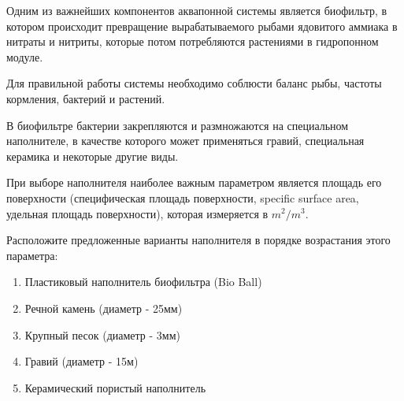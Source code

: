 
Одним из важнейших компонентов аквапонной системы является биофильтр, в котором происходит превращение вырабатываемого рыбами ядовитого аммиака в нитраты и нитриты, которые потом потребляются растениями в гидропонном модуле.

Для правильной работы системы необходимо соблюсти баланс рыбы, частоты кормления,  бактерий и растений.

В биофильтре бактерии закрепляются и размножаются на специальном наполнителе, в качестве которого может применяться гравий, специальная керамика и некоторые другие виды.

При выборе наполнителя наиболее важным параметром является площадь его поверхности 
(специфическая площадь поверхности, specific surface area, удельная площадь поверхности), 
которая измеряется в $m^2/m^3$.

Расположите предложенные варианты наполнителя в порядке возрастания этого параметра:

\begin{enumerate}
    \item Пластиковый наполнитель биофильтра (Bio Ball)
    \item Речной камень (диаметр - 25мм)
    \item Крупный песок (диаметр - 3мм)
    \item Гравий (диаметр - 15м) 
    \item Керамический пористый наполнитель
\end{enumerate}
